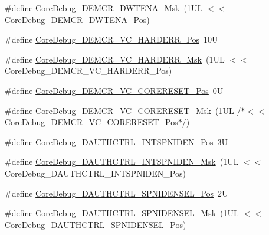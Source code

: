 \begin{DoxyCompactItemize}
\item 
\#define \mbox{\hyperlink{group___c_m_s_i_s___core_debug_ga2fcc0b8f174e85379d38e1cb74b8c627}{Core\+Debug\+\_\+\+D\+E\+M\+C\+R\+\_\+\+D\+W\+T\+E\+N\+A\+\_\+\+Msk}}~(1\+U\+L $<$$<$ Core\+Debug\+\_\+\+D\+E\+M\+C\+R\+\_\+\+D\+W\+T\+E\+N\+A\+\_\+\+Pos)
\item 
\#define \mbox{\hyperlink{group___c_m_s_i_s___core_debug_gaed9f42053031a9a30cd8054623304c0a}{Core\+Debug\+\_\+\+D\+E\+M\+C\+R\+\_\+\+V\+C\+\_\+\+H\+A\+R\+D\+E\+R\+R\+\_\+\+Pos}}~10U
\item 
\#define \mbox{\hyperlink{group___c_m_s_i_s___core_debug_ga803fc98c5bb85f10f0347b23794847d1}{Core\+Debug\+\_\+\+D\+E\+M\+C\+R\+\_\+\+V\+C\+\_\+\+H\+A\+R\+D\+E\+R\+R\+\_\+\+Msk}}~(1\+U\+L $<$$<$ Core\+Debug\+\_\+\+D\+E\+M\+C\+R\+\_\+\+V\+C\+\_\+\+H\+A\+R\+D\+E\+R\+R\+\_\+\+Pos)
\item 
\#define \mbox{\hyperlink{group___c_m_s_i_s___core_debug_ga9fcf09666f7063a7303117aa32a85d5a}{Core\+Debug\+\_\+\+D\+E\+M\+C\+R\+\_\+\+V\+C\+\_\+\+C\+O\+R\+E\+R\+E\+S\+E\+T\+\_\+\+Pos}}~0U
\item 
\#define \mbox{\hyperlink{group___c_m_s_i_s___core_debug_ga906476e53c1e1487c30f3a1181df9e30}{Core\+Debug\+\_\+\+D\+E\+M\+C\+R\+\_\+\+V\+C\+\_\+\+C\+O\+R\+E\+R\+E\+S\+E\+T\+\_\+\+Msk}}~(1\+U\+L /$\ast$$<$$<$ Core\+Debug\+\_\+\+D\+E\+M\+C\+R\+\_\+\+V\+C\+\_\+\+C\+O\+R\+E\+R\+E\+S\+E\+T\+\_\+\+Pos$\ast$/)
\item 
\#define \mbox{\hyperlink{group___c_m_s_i_s___core_debug_gaf733a36e6b4717a604f7d77c05dfceb4}{Core\+Debug\+\_\+\+D\+A\+U\+T\+H\+C\+T\+R\+L\+\_\+\+I\+N\+T\+S\+P\+N\+I\+D\+E\+N\+\_\+\+Pos}}~3U
\item 
\#define \mbox{\hyperlink{group___c_m_s_i_s___core_debug_gadad0bf68d32cba49c1ea7534122c2752}{Core\+Debug\+\_\+\+D\+A\+U\+T\+H\+C\+T\+R\+L\+\_\+\+I\+N\+T\+S\+P\+N\+I\+D\+E\+N\+\_\+\+Msk}}~(1\+U\+L $<$$<$ Core\+Debug\+\_\+\+D\+A\+U\+T\+H\+C\+T\+R\+L\+\_\+\+I\+N\+T\+S\+P\+N\+I\+D\+E\+N\+\_\+\+Pos)
\item 
\#define \mbox{\hyperlink{group___c_m_s_i_s___core_debug_ga866734a8e4bec2d6cf091e265c6c0f3d}{Core\+Debug\+\_\+\+D\+A\+U\+T\+H\+C\+T\+R\+L\+\_\+\+S\+P\+N\+I\+D\+E\+N\+S\+E\+L\+\_\+\+Pos}}~2U
\item 
\#define \mbox{\hyperlink{group___c_m_s_i_s___core_debug_gaabb5d6c750c9ec50254134ece2111dcd}{Core\+Debug\+\_\+\+D\+A\+U\+T\+H\+C\+T\+R\+L\+\_\+\+S\+P\+N\+I\+D\+E\+N\+S\+E\+L\+\_\+\+Msk}}~(1\+U\+L $<$$<$ Core\+Debug\+\_\+\+D\+A\+U\+T\+H\+C\+T\+R\+L\+\_\+\+S\+P\+N\+I\+D\+E\+N\+S\+E\+L\+\_\+\+Pos)
\item 

\end{DoxyCompactItemize}
